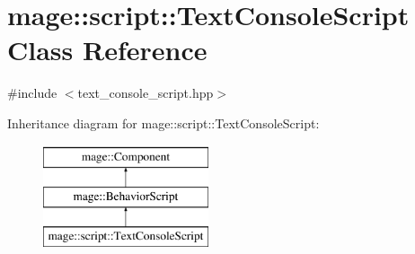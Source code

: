 \hypertarget{classmage_1_1script_1_1_text_console_script}{}\section{mage\+:\+:script\+:\+:Text\+Console\+Script Class Reference}
\label{classmage_1_1script_1_1_text_console_script}


{\ttfamily \#include $<$text\+\_\+console\+\_\+script.\+hpp$>$}

Inheritance diagram for mage\+:\+:script\+:\+:Text\+Console\+Script\+:\begin{figure}[H]
\begin{center}
\leavevmode
\includegraphics[height=3.000000cm]{classmage_1_1script_1_1_text_console_script}
\end{center}
\end{figure}
